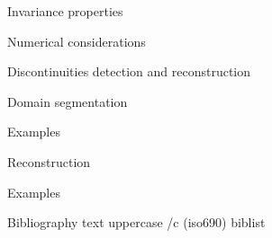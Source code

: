 \sec Invariance properties


\sec[numericalsec] Numerical considerations


\chap Discontinuities detection\nl ^^J
      and reconstruction

\sec[domseg] Domain segmentation

       \nonum\secc Examples
       

\sec Reconstruction

       \nonum\secc Examples
       












\def\_mtext#1{BIBLIOGRAPHY}
\let\uppercase\ignoreit
\nonum\chap Bibliography
\let\_mtext\omtext
\let\uppercase\_uppercase
\def\_opwarning#1{}
\usebib/c (iso690) biblist


\bye

